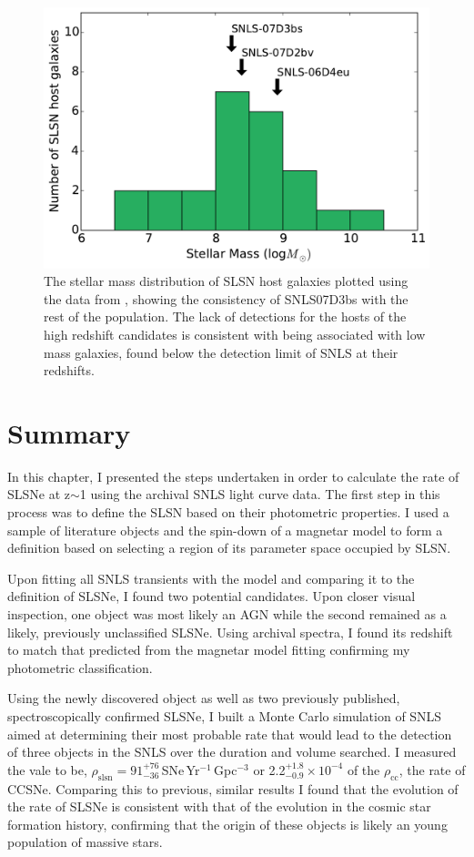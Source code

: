 \begin{figure}
\includegraphics[width=\textwidth]{Figures/Chapter4/Galaxy}
\caption{The stellar mass distribution of SLSN host galaxies plotted using the data from \citet{Lunnan2014}, showing the consistency of SNLS07D3bs with the rest of the population. The lack of detections for the hosts of the high redshift candidates is consistent with being associated with low mass galaxies, found below the detection limit of SNLS at their redshifts.}
\label{fig:hosts}
\end{figure}

\section{Summary}
In this chapter, I presented the steps undertaken in order to calculate the rate of SLSNe at z$\sim$1 using the archival SNLS light curve data. The first step in this process was to define the SLSN based on their photometric properties. I used a sample of literature objects and the spin-down of a magnetar model to form a definition based on selecting a region of its parameter space occupied by SLSN.

Upon fitting all SNLS transients with the model and comparing it to the definition of SLSNe, I found two potential candidates. Upon closer visual inspection, one object was most likely an AGN while the second remained as a likely, previously unclassified SLSNe. Using archival spectra, I found its redshift to match that predicted from the magnetar model fitting confirming my photometric classification.

Using the newly discovered object as well as two previously published, spectroscopically confirmed SLSNe, I built a Monte Carlo simulation of SNLS aimed at determining their most probable rate that would lead to the detection of three objects in the SNLS over the duration and volume searched. I measured the vale to be, $\rho_{\mathrm{slsn}} = 91^{+76}_{-36}$\,SNe\,Yr$^{-1}$\,Gpc$^{-3}$ or 2.2$^{+1.8}_{-0.9}\times10^{-4}$ of the $\rho_{\mathrm{cc}}$, the rate of CCSNe. Comparing this to previous, similar results I found that the evolution of the rate of SLSNe is consistent with that of the evolution in the cosmic star formation history, confirming that the origin of these objects is likely an young population of massive stars.
